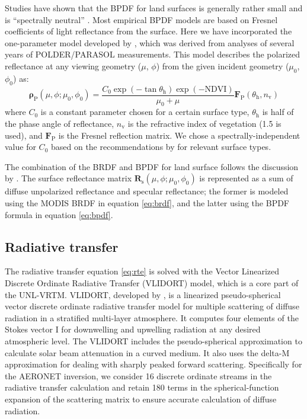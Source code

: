 Studies have shown that the BPDF for land surfaces is generally rather
small and is “spectrally neutral” \citep{Nadal99, Maignan04, Maignan09,
Waquet07, Litvinov11}. 
Most empirical BPDF models are based on Fresnel coefficients of light
reflectance from the surface. Here we have incorporated the
one-parameter model developed by \citet{Maignan09}, which was
derived from analyses of several years of POLDER/PARASOL measurements.
This model describes the polarized reflectance at any viewing geometry
($\mu$, $\phi$) from the given incident geometry ($\mu_0$, $\phi_0$) as:
\begin{equation}
\pmb{\rho}_\text{P}(\mu,\phi;\mu_0,\phi_0) = 
\frac{C_0 \exp(-\tan \theta_\text{h})\exp(-\text{NDVI})}{\mu_0+\mu} 
\mathbf{F}_\text{P}(\theta_\text{h},n_\text{v}) \label{eq:bpdf}
\end{equation}
where $C_0$ is a constant parameter chosen for a certain surface type,
$\theta_\text{h}$ is half of the phase angle of reflectance, $n_\text{v}$ is 
the refractive index of vegetation (1.5 is used), and
$\mathbf{F}_\text{P}$ is the Fresnel reflection matrix. 
We chose a spectrally-independent value for $C_0$ based
on the recommendations by \citet{Maignan09} for relevant surface types. 

The combination of the BRDF and BPDF for land surface follows the
discussion by \citet{Dubovik11}. The surface reflectance matrix 
$\mathbf{R}_\text{s}(\mu,\phi;\mu_0,\phi_0)$
is represented as a sum of diffuse unpolarized
reflectance and specular reflectance; the former is modeled using the
MODIS BRDF in equation \eqref{eq:brdf}, and the latter using the BPDF 
formula in equation \eqref{eq:bpdf}. 

\subsection{Radiative transfer} \label{subsec:vlidort}

The radiative transfer equation \eqref{eq:rte} is solved with the 
Vector Linearized Discrete Ordinate Radiative Transfer (VLIDORT)
model, which is a core part of the UNL-VRTM. VLIDORT, 
developed by \citet{Spurr06}, is a
linearized pseudo-spherical vector discrete ordinate radiative transfer
model for multiple scattering of diffuse radiation in a stratified
multi-layer atmosphere. It computes four elements of the Stokes vector I
for downwelling and upwelling radiation at any desired atmospheric
level. The VLIDORT includes the pseudo-spherical approximation to
calculate solar beam attenuation in a curved medium. It also uses the
delta-M approximation for dealing with sharply peaked forward
scattering. Specifically for the AERONET inversion, we consider 16
discrete ordinate streams in the radiative transfer calculation and
retain 180 terms in the spherical-function expansion of the scattering
matrix to ensure accurate calculation of diffuse radiation. 

